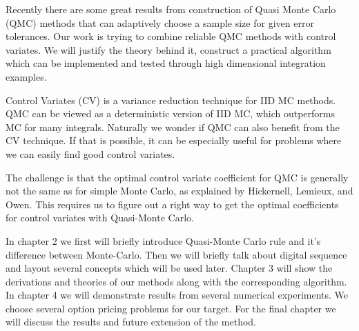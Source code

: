 

Recently there are some great results from construction of Quasi Monte Carlo (QMC) methods that can adaptively choose a sample size for given error tolerances\cite{hickernell2014reliable}.   
Our work is trying to combine reliable QMC methods with control variates. We will justify the theory behind it, construct a practical algorithm which can be implemented and tested through high dimensional integration examples.


Control Variates (CV) is a variance reduction technique for IID MC methods.
QMC can be viewed as a deterministic version of IID MC, which outperforms MC for many integrals\cite{avramidis1996integrated}. 
Naturally we wonder if QMC can also benefit from the CV technique. If that is possible, it can be especially useful for problems where we can easily find good control variates.


The challenge is that the optimal control variate coefficient for QMC is generally not the same as for simple Monte Carlo, as explained by Hickernell, Lemieux, and Owen\cite{hickernell2005control}. This requires us to figure out a right way to get the optimal coefficients for control variates with Quasi-Monte Carlo.


In chapter 2 we first will briefly introduce Quasi-Monte Carlo rule and it's difference between Monte-Carlo. Then we will briefly talk about digital sequence and layout several concepts which will be used later. 
Chapter 3 will show the derivations and theories of our methods along with the corresponding algorithm.
In chapter 4 we will demonstrate results from several numerical experiments. We choose several option pricing problems for our target. For the final chapter we will discuss the results and future extension of the method.
